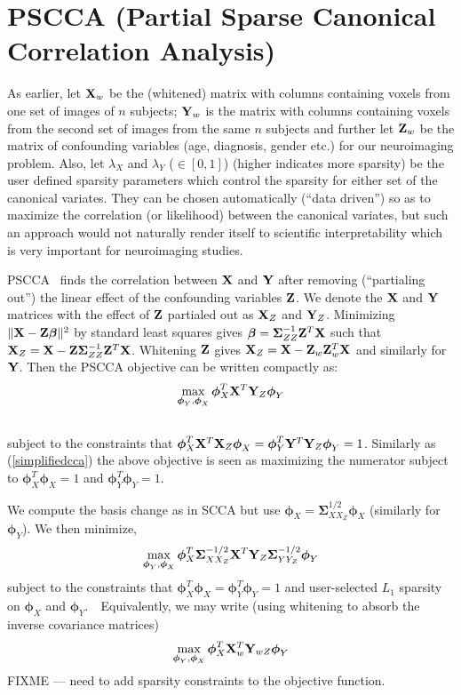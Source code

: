 \documentclass{llncs}
\newcommand{\X}{{\bf X}}
\newcommand{\Y}{{\bf Y}}
\newcommand{\Z}{{\bf Z}}
\newcommand{\bs}{\boldsymbol}
\newcommand{\bSigma}{\boldsymbol \Sigma}
\begin{document}
\section{PSCCA (Partial Sparse Canonical Correlation Analysis)}
As earlier, let $\X_w$ be the (whitened) matrix with columns containing voxels from one set of
images of $n$ subjects; $\Y_w$ is the matrix with columns containing voxels from the second
set of images from the same $n$ subjects and further let $\Z_w$ be the matrix of confounding variables (age, diagnosis, gender etc.) for our neuroimaging problem. Also, let $\lambda_X$ and $\lambda_Y$ ($\in [0,1]$) (higher indicates more sparsity) be the user defined sparsity parameters which control the sparsity for either set of the canonical variates. They can be chosen automatically (``data driven'') so as to maximize the correlation (or likelihood) between the canonical variates, but such an approach would not naturally render itself  to scientific interpretability which is very important for neuroimaging studies. 

PSCCA~\cite{timm} finds the correlation between $\X$ and $\Y$ after
removing (``partialing out'') the linear effect of the confounding
variables $\Z$.  We denote the $\X$ and $\Y$ matrices with the effect
of $\Z$ partialed out as $\X_Z$ and $\Y_Z$.  Minimizing $\| \X - \Z
\bs\beta \|^2 $ by standard least squares gives
 $\bs\beta = \bSigma_{ZZ}^{-1} \Z^T \X$ such that $\X_Z = \X - \Z  \bSigma_{ZZ}^{-1} \Z^T \X$.  Whitening $\Z$ gives $\X_Z=\X - \Z_w \Z_w^T \X$
 and similarly for $\Y$. 
Then the PSCCA objective can be written compactly as:
\begin{eqnarray}
\label{pscca}
\max_{{\bs\phi_Y}, {\bs\phi_X}} \bs\phi_X^T  \X^T \Y_Z \bs\phi_Y \\ \notag
\end{eqnarray}
subject to the constraints that $\bs\phi_X^T \X^T \X_Z \bs\phi_X 
=  \bs\phi_Y^T \Y^T \Y_Z \bs\phi_Y = 1$.
Similarly as (\ref{simplifiedcca}) the above objective is seen as maximizing the numerator subject to  $\bs\phi_X^T\bs\phi_X=1$ and $\bs\phi_Y^T\bs\phi_Y=1$.

We compute the basis change as in SCCA but use $\bs\phi_X=\bSigma^{1/2}_{XX_Z}\bs\phi_X$
(similarly for $\bs\phi_Y$).  We then minimize,
\begin{eqnarray}
\label{pscca}
\max_{{\bs\phi_Y}, {\bs\phi_X}} \bs\phi_X^T \bSigma^{-1/2}_{XX_Z} \X^T \Y_Z \bSigma^{-1/2}_{YY_Z}\bs\phi_Y 
\end{eqnarray}
subject to the constraints that $\bs\phi_X^T \bs\phi_X 
=  \bs\phi_Y^T \bs\phi_Y = 1$ and user-selected $L_1$ sparsity on 
$\bs\phi_X$ and $\bs\phi_Y$.~~Equivalently, we may write (using
whitening to absorb the inverse covariance matrices)
\begin{eqnarray}
\label{pscca}
\max_{{\bs\phi_Y}, {\bs\phi_X}} \bs\phi_X^T \X_w^T \Y_{wZ} \bs\phi_Y 
\end{eqnarray}
FIXME --- need to add sparsity constraints to the objective function.
\end{document}
